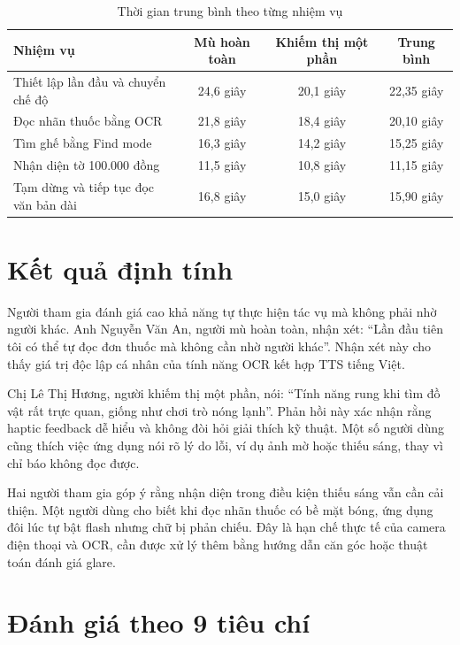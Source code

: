 \documentclass[a4paper,13pt]{report}
\begin{document}
\begin{table}[H]
\centering
\caption{Thời gian trung bình theo từng nhiệm vụ}
\label{tab:task-time}
\begin{tabularx}{\textwidth}{Xccc}
\toprule
\textbf{Nhiệm vụ} & \textbf{Mù hoàn toàn} & \textbf{Khiếm thị một phần} & \textbf{Trung bình} \\
\midrule
Thiết lập lần đầu và chuyển chế độ & 24,6 giây & 20,1 giây & 22,35 giây \\
Đọc nhãn thuốc bằng OCR & 21,8 giây & 18,4 giây & 20,10 giây \\
Tìm ghế bằng Find mode & 16,3 giây & 14,2 giây & 15,25 giây \\
Nhận diện tờ 100.000 đồng & 11,5 giây & 10,8 giây & 11,15 giây \\
Tạm dừng và tiếp tục đọc văn bản dài & 16,8 giây & 15,0 giây & 15,90 giây \\
\bottomrule
\end{tabularx}
\end{table}

\section{Kết quả định tính}

Người tham gia đánh giá cao khả năng tự thực hiện tác vụ mà không phải nhờ người khác. Anh Nguyễn Văn An, người mù hoàn toàn, nhận xét: ``Lần đầu tiên tôi có thể tự đọc đơn thuốc mà không cần nhờ người khác''. Nhận xét này cho thấy giá trị độc lập cá nhân của tính năng OCR kết hợp TTS tiếng Việt.

Chị Lê Thị Hương, người khiếm thị một phần, nói: ``Tính năng rung khi tìm đồ vật rất trực quan, giống như chơi trò nóng lạnh''. Phản hồi này xác nhận rằng haptic feedback dễ hiểu và không đòi hỏi giải thích kỹ thuật. Một số người dùng cũng thích việc ứng dụng nói rõ lý do lỗi, ví dụ ảnh mờ hoặc thiếu sáng, thay vì chỉ báo không đọc được.

Hai người tham gia góp ý rằng nhận diện trong điều kiện thiếu sáng vẫn cần cải thiện. Một người dùng cho biết khi đọc nhãn thuốc có bề mặt bóng, ứng dụng đôi lúc tự bật flash nhưng chữ bị phản chiếu. Đây là hạn chế thực tế của camera điện thoại và OCR, cần được xử lý thêm bằng hướng dẫn căn góc hoặc thuật toán đánh giá glare.

\section{Đánh giá theo 9 tiêu chí}
\end{document}

